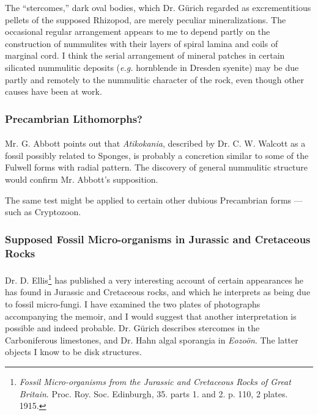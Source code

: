 \documentclass[a4paper, 12pt, oneside, landscape]{article}
\begin{document}
The ``stercomes,'' dark oval bodies, which Dr. Gürich regarded as excrementitious pellets of the supposed Rhizopod, are merely peculiar mineralizations. The occasional regular arrangement appears to me to depend partly on the construction of nummulites with their layers of spiral lamina and coils of marginal cord. I think the serial arrangement of mineral patches in certain silicated nummulitic deposits (\emph{e.g.} hornblende in Dresden syenite) may be due partly and remotely to the nummulitic character of the rock, even though other causes have been at work.

\subsubsection{Precambrian Lithomorphs?}
\paragraph{}
Mr. G. Abbott points out that \emph{Atikokania}, described by Dr. C. W. Walcott as a fossil possibly related to Sponges, is probably a concretion similar to some of the Fulwell forms with radial pattern. The discovery of general nummulitic structure would confirm Mr. Abbott's supposition.

The same test might be applied to certain other dubious Precambrian forms --- such as Cryptozoon.

\subsubsection{Supposed Fossil Micro-organisms in Jurassic and Cretaceous Rocks}
\paragraph{}
Dr. D. Ellis\footnote{\emph{Fossil Micro-organisms from the Jurassic and Cretaceous Rocks of Great Britain}. Proc. Roy. Soc. Edinburgh, 35. parts 1. and 2. p. 110, 2 plates. 1915.} has published a very interesting account of certain appearances he has found in Jurassic and Cretaceous rocks, and which he interprets as being due to fossil micro-fungi. I have examined the two plates of photographs accompanying the memoir, and I would suggest that another interpretation is possible and indeed probable. Dr. Gürich describes stercomes in the Carboniferous limestones, and Dr. Hahn algal sporangia in \emph{Eozoön}. The latter objects I know to be disk structures.
\end{document}
